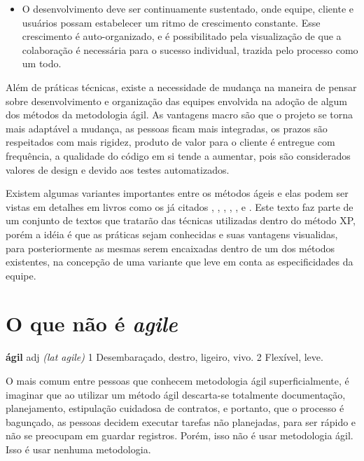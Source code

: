 \documentclass[10pt,a4paper,font=plain]{abnt}
\begin{document}
\begin{itemize}
\item O desenvolvimento deve ser continuamente sustentado, onde equipe, cliente e usuários possam estabelecer um ritmo de crescimento constante. Esse crescimento é auto-organizado, e é possibilitado pela visualização de que a colaboração é necessária para o sucesso individual, trazida pelo processo como um todo.
\end{itemize}

Além de práticas técnicas, existe a necessidade de mudança na maneira de pensar sobre desenvolvimento e organização das equipes envolvida na adoção de algum dos métodos da metodologia ágil. As vantagens macro são que o projeto se torna mais adaptável a mudança, as pessoas ficam mais integradas, os prazos são respeitados com mais rigidez, produto de valor para o cliente é entregue com frequência, a qualidade do código em si tende a aumentar, pois são considerados valores de design e devido aos testes automatizados. 

Existem algumas variantes importantes entre os métodos ágeis e elas podem ser vistas em detalhes em livros como os já citados \cite{XPExplained}, \cite{DSDM}, \cite{Crystal}, \cite{ASD}, \cite {ScrumXP},  e \cite{Lean}. Este texto faz parte de um conjunto de textos que tratarão das técnicas utilizadas dentro do método XP, porém a idéia é que as práticas sejam conhecidas e suas vantagens visualidas, para posteriormente as mesmas serem encaixadas dentro de um dos métodos existentes, na concepção de uma variante que leve em conta as especificidades da equipe.

\section {O que não é \textit{agile}}

\begin{center}\textbf{ágil} adj \textit{(lat agile)} 1 Desembaraçado, destro, ligeiro, vivo. 2 Flexível, leve.  \end{center}

O mais comum entre pessoas que conhecem metodologia ágil superficialmente, é imaginar que ao utilizar um método ágil descarta-se totalmente documentação, planejamento, estipulação cuidadosa de contratos, e portanto, que o processo é bagunçado, as pessoas decidem executar tarefas não planejadas, para ser rápido e não se preocupam em guardar registros. Porém, isso não é usar metodologia ágil. Isso é usar nenhuma metodologia. 
\end{document}
